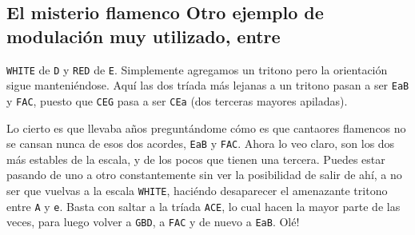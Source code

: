 \documentclass[]{article}
\begin{document}
\subsection{El misterio flamenco Otro ejemplo de modulación muy utilizado, entre} \texttt{WHITE} de \texttt{D} y \texttt{RED} de \texttt{E}. Simplemente agregamos un tritono pero la orientación sigue manteniéndose. Aquí las dos tríada más lejanas a un tritono pasan a ser \texttt{EaB} y \texttt{FAC}, puesto que \texttt{CEG} pasa a ser \texttt{CEa} (dos terceras mayores apiladas).

Lo cierto es que llevaba años preguntándome cómo es que cantaores flamencos no se cansan nunca de esos dos acordes, \texttt{EaB} y \texttt{FAC}. Ahora lo veo claro, son los dos más estables de la escala, y de los pocos que tienen una tercera. Puedes estar pasando de uno a otro constantemente sin ver la posibilidad de salir de ahí, a no ser que vuelvas a la escala \texttt{WHITE}, haciéndo desaparecer el amenazante tritono entre \texttt{A} y \texttt{e}. Basta con saltar a la tríada \texttt{ACE}, lo cual hacen la mayor parte de las veces, para luego volver a \texttt{GBD}, a \texttt{FAC} y de nuevo a \texttt{EaB}. Olé!
\end{document}

